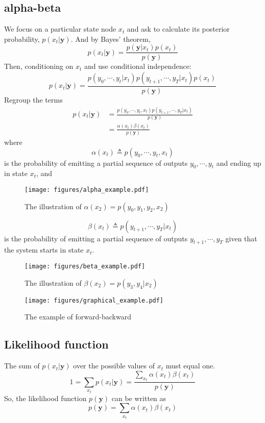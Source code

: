 \documentclass[journal=jpcbfk,manuscript=article,layout=singlecolumn,articletitle=true]{achemso}
\begin{document}
\subsection{alpha-beta}
We focus on a particular state node $x_t$ and ask to calculate its posterior probability, $p(x_t| \textbf{y})$. And by Bayes' theorem,
\begin{equation}
p(x_t | \textbf{y}) = \frac{p(\textbf{y}|x_t) p(x_t)}{p(\textbf{y})}
\end{equation}
Then, conditioning on $x_t$ and use conditional independence:
\begin{equation}
p(x_t | \textbf{y}) = \frac{p(y_0,\cdots,y_t|x_t) p(y_{t+1},\cdots,y_T|x_t) p(x_t)}{p(\textbf{y})}
\end{equation}
Regroup the terms
\begin{equation}
\begin{split}
p(x_t | \textbf{y}) &= \frac{p(y_0,\cdots,y_t,x_t) p(y_{t+1},\cdots,y_T|x_t)}{p(\textbf{y})}\\
&=\frac{\alpha(x_t)\beta(x_t)}{p(\textbf{y})}
\end{split}
\end{equation}
where 
\begin{equation}
\alpha(x_t) \triangleq p(y_0,\cdots,y_t,x_t)
\end{equation}
is the probability of emitting a partial sequence of outputs $y_0,\cdots,y_t$ and ending up in state $x_t$, and
\begin{figure}[h]
\texttt{[image: figures/alpha\_example.pdf]}
\caption[Alpha]{The illustration of $\alpha(x_2)=p(y_0,y_1,y_2,x_2)$}
\label{alpha}
\end{figure}
\begin{equation}
\beta(x_t) \triangleq p(y_{t+1},\cdots,y_T|x_t)
\end{equation}
is the probability of emitting a partial sequence of outputs $y_{t+1},\cdots,y_T$ given that the system starts in state $x_t$. 
\begin{figure}[h]
\texttt{[image: figures/beta\_example.pdf]}
\caption[Beta]{The illustration of $\beta(x_2)=p(y_3,y_4|x_2)$}
\label{beta}
\end{figure}

\begin{figure}[b]
\texttt{[image: figures/graphical\_example.pdf]}
\caption[Graphical Model]{The example of forward-backward}
\label{domaindecomp}
\end{figure}

\subsection{Likelihood function}
The sum of $p(x_t|\textbf{y})$ over the possible values of $x_t$ must equal one.
\begin{equation}
1 = \sum_{x_t} p(x_t|\textbf{y}) = \frac{\sum_{x_t} \alpha(x_t)\beta(x_t)}{p(\textbf{y})}
\end{equation}
So, the likelihood function $p(\textbf{y})$ can be written as
\begin{equation}
p(\textbf{y})=\sum_{x_t} \alpha(x_t)\beta(x_t)
\end{equation}
\end{document}
